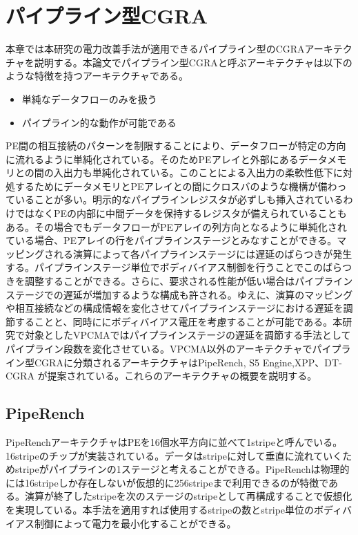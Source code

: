 \chapter{パイプライン型CGRA}
{
\label{chap:survey}

本章では本研究の電力改善手法が適用できるパイプライン型のCGRAアーキテクチャを説明する。本論文でパイプライン型CGRAと呼ぶアーキテクチャは以下のような特徴を持つアーキテクチャである。

\begin{itemize}
\item 単純なデータフローのみを扱う
\item パイプライン的な動作が可能である
\end{itemize}

PE間の相互接続のパターンを制限することにより、データフローが特定の方向に流れるように単純化されている。そのためPEアレイと外部にあるデータメモリとの間の入出力も単純化されている。このことによる入出力の柔軟性低下に対処するためにデータメモリとPEアレイとの間にクロスバのような機構が備わっていることが多い。明示的なパイプラインレジスタが必ずしも挿入されているわけではなくPEの内部に中間データを保持するレジスタが備えられていることもある。その場合でもデータフローがPEアレイの列方向となるように単純化されている場合、PEアレイの行をパイプラインステージとみなすことができる。マッピングされる演算によって各パイプラインステージには遅延のばらつきが発生する。パイプラインステージ単位でボディバイアス制御を行うことでこのばらつきを調整することができる。さらに、要求される性能が低い場合はパイプラインステージでの遅延が増加するような構成も許される。ゆえに、演算のマッピングや相互接続などの構成情報を変化させてパイプラインステージにおける遅延を調節することと、同時ににボディバイアス電圧を考慮することが可能である。本研究で対象としたVPCMAではパイプラインステージの遅延を調節する手法としてパイプライン段数を変化させている。VPCMA以外のアーキテクチャでパイプライン型CGRAに分類されるアーキテクチャはPipeRench\cite{piperench}, S5 Engine\cite{s5},XPP\cite{xpp}、DT-CGRA\cite{DT-CGRA}
が提案されている。これらのアーキテクチャの概要を説明する。

\section{PipeRench}
\label{sec:PipeRench}
PipeRenchアーキテクチャはPEを16個水平方向に並べて1stripeと呼んでいる。16stripeのチップが実装されている。データはstripeに対して垂直に流れていくためstripeがパイプラインの1ステージと考えることができる。PipeRenchは物理的には16stripeしか存在しないが仮想的に256stripeまで利用できるのが特徴である。演算が終了したstripeを次のステージのstripeとして再構成することで仮想化を実現している。本手法を適用すれば使用するstripeの数とstripe単位のボディバイアス制御によって電力を最小化することができる。


}
